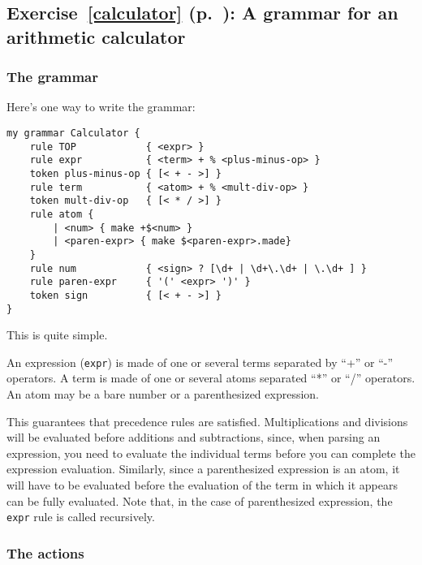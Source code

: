 \subsection{Exercise~\ref{calculator} (p.~\pageref{calculator}): 
A grammar for an arithmetic calculator}
\label{sol_calculator}

\subsubsection{The grammar}

Here's one way to write the grammar:

\begin{verbatim}
my grammar Calculator {
    rule TOP            { <expr> }
    rule expr           { <term> + % <plus-minus-op> }
    token plus-minus-op { [< + - >] }
    rule term           { <atom> + % <mult-div-op> }
    token mult-div-op   { [< * / >] }
    rule atom {
        | <num> { make +$<num> }
        | <paren-expr> { make $<paren-expr>.made}
    }
    rule num            { <sign> ? [\d+ | \d+\.\d+ | \.\d+ ] }
    rule paren-expr     { '(' <expr> ')' }
    token sign          { [< + - >] }
}
\end{verbatim}

This is quite simple.

An expression (\verb'expr') is made of one or several terms 
separated by ``+'' or ``-'' operators. A term is made of one 
or several atoms separated ``*'' or ``/'' operators. An atom 
may be a bare number or a parenthesized expression.

This guarantees that precedence rules are satisfied. 
Multiplications and divisions will be 
evaluated before additions and subtractions, since, when 
parsing an expression, you need to evaluate the individual 
terms before you can complete the expression evaluation. 
Similarly, since a parenthesized expression is an atom, it 
will have to be evaluated before the evaluation of the term 
in which it appears can be fully evaluated. Note that, in 
the case of parenthesized expression, the \verb'expr' rule 
is called recursively.

\subsubsection{The actions}

